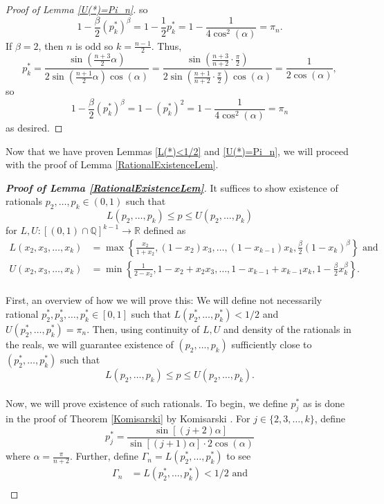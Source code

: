 \documentclass[11pt]{article}
\theoremstyle{definition}
\begin{document}
\begin{proof}[Proof of Lemma \ref{U(*)=Pi_n}]
    so
    $$1-\frac{\beta}{2}(p_k^*)^\beta = 1-\frac{1}{2}p_k^* = 1- \frac{1}{4\cos^2(\alpha)} = \pi_n.$$
    If $\beta = 2$, then $n$ is odd so $k = \frac{n-1}{2}$. Thus,
    $$p_k^* = \frac{\sin\left( \frac{n+3}{2} \alpha\right)}{2\sin\left( \frac{n+1}{2} \alpha \right) \cos(\alpha)} = \frac{\sin\left( \frac{n+3}{n+2} \cdot \frac{\pi}{2} \right)}{2\sin\left( \frac{n+1}{n+2} \cdot \frac{\pi}{2} \right) \cos(\alpha)} = \frac{1}{2\cos(\alpha)},$$
    so
    $$1-\frac{\beta}{2}(p_k^*)^\beta = 1-(p_k^*)^2 = 1-\frac{1}{4\cos^2(\alpha)} = \pi_n$$
    as desired.
\end{proof}


Now that we have proven Lemmas \ref{L(*)<1/2} and \ref{U(*)=Pi_n}, we will proceed with the proof of Lemma \ref{RationalExistenceLem}.
\begin{proof}[\bf{Proof of Lemma \ref{RationalExistenceLem}}]
    It suffices to show existence of rationals $p_2,\dots, p_k \in (0,1)$ such that
    $$L(p_2,\dots,p_k) \leq p \leq U(p_2,\dots,p_k)$$
    for $L,U: [(0,1)\cap \mathbb{Q}]^{k-1} \to \mathbb{R}$ defined as
    \begin{align*}
        L(x_2,x_3,\dots,x_k) &= \max \left\{ \frac{x_2}{1+x_2}, (1-x_2)x_3, \dots, (1-x_{k-1})x_{k}, \frac{\beta}{2}(1-x_k)^\beta \right\} \text{ and}\\
        U(x_2,x_3,\dots,x_k) &= \min \left\{ \frac{1}{2-x_2},1-x_2+x_2x_3, \dots, 1-x_{k-1}+x_{k-1}x_{k}, 1-\frac{\beta}{2}x_k^\beta \right\}.
    \end{align*}
    \\[5mm] First, an overview of how we will prove this: We will define not necessarily rational $p_2^*, p_3^*,\dots, p_k^* \in [0,1]$ such that $L(p_2^*,\dots, p_k^*) < 1/2$ and $U(p_2^*,\dots, p_k^*) = \pi_n$. Then, using continuity of $L,U$ and density of the rationals in the reals, we will guarantee existence of $(p_2,\dots,p_k)$ sufficiently close to $(p_2^*,\dots, p_k^*)$ such that
    $$L(p_2,\dots,p_k) \leq p \leq U(p_2,\dots,p_k).$$
    \\[5mm] Now, we will prove existence of such rationals. To begin, we define $p_j^*$ as is done in the proof of Theorem \ref{Komisarski} by Komisarski \cite{Komisarski2021}. For $j \in \{ 2,3,\dots, k\}$, define
    $$p_j^* = \frac{\sin\left[ (j+2)\alpha \right]}{\sin\left[ (j+1)\alpha \right] \cdot 2\cos(\alpha)}$$
    where $\alpha = \frac{\pi}{n+2}$. Further, define $\Gamma_n = L(p_2^*,\dots,p_k^*)$ to see
    \begin{align*}
        \Gamma_n &= L(p_2^*,\dots,p_k^*) < 1/2 \text{ and} \\

\end{align*}
\end{proof}
\end{document}
